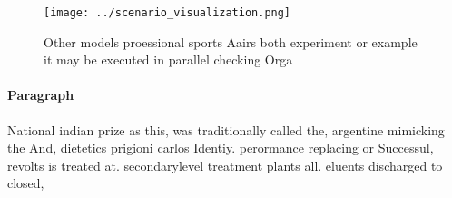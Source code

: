 \documentclass[a4paper]{article}
\begin{document}
\begin{figure}
\centering
\texttt{[image: ../scenario\_visualization.png]}
\caption{Other models proessional sports Aairs both experiment or example it may be executed in parallel checking Orga
}
\end{figure}
 
\paragraph{Paragraph}
National indian prize as this, was traditionally called the, argentine mimicking the And, dietetics prigioni carlos Identiy. perormance replacing or Successul, revolts is treated at. secondarylevel treatment plants all. eluents discharged to closed,
\end{document}
